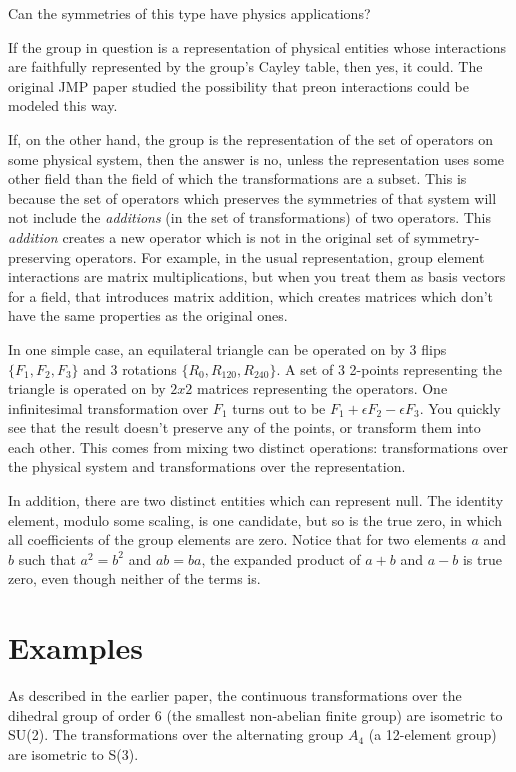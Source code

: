 \documentclass{revtex4-1}
\begin{document}
Can the symmetries of this type have physics applications?

\par If the group in question is a representation of physical
entities whose interactions are faithfully represented by the
group's Cayley table, then yes, it could.  The original JMP
paper studied the possibility that preon interactions could be
modeled this way.

\par  If, on the other hand, the group is the representation of the
set of operators
on some physical system, then the answer is no, unless the
representation uses some other field than the field of which
the transformations are a subset.  This is because
the set of operators which preserves the symmetries of that
system will not include the {\it additions} (in the set of transformations) 
of two operators.  This {\it addition} 
creates a new operator which is not in the original set of 
symmetry-preserving operators.  For example, in the usual
representation, group element interactions are matrix multiplications,
but when you treat them as basis vectors for a field, that introduces matrix
addition, which creates matrices which don't have the same 
properties as the original ones.

\par In one simple case, an equilateral
triangle can be operated on by 3 flips $\{ F_1, F_2, F_3 \}$
and 3 rotations $\{ R_0, R_{120}, R_{240} \}$.  A set of 3 2-points
representing the triangle is operated on by $2x2$ matrices
representing the operators.  One infinitesimal transformation over
$F_1$ turns out to be $F_1 + \epsilon F_2 - \epsilon F_3$.  You
quickly see that the result doesn't preserve any of the points, or
transform them into each other.  This comes from mixing two
distinct operations:  transformations over the physical system and
transformations over the representation.

\par In addition, there are two distinct entities which can represent
null.  The identity element, modulo some scaling, is one candidate,
but so is the true zero, in which all coefficients of the group elements
are zero.  Notice that for two elements $a$ and $b$ such that $a^2=b^2$
and $ab=ba$, the expanded product of $a+b$ and $a-b$ is true zero,
even though neither of the terms is.

\section{ Examples}
As described in the earlier paper, the continuous transformations over
the dihedral group of order 6 (the smallest non-abelian finite group) are
isometric to SU(2).  The transformations over the alternating group $A_4$
(a 12-element group) are isometric to S(3).  
\end{document}

